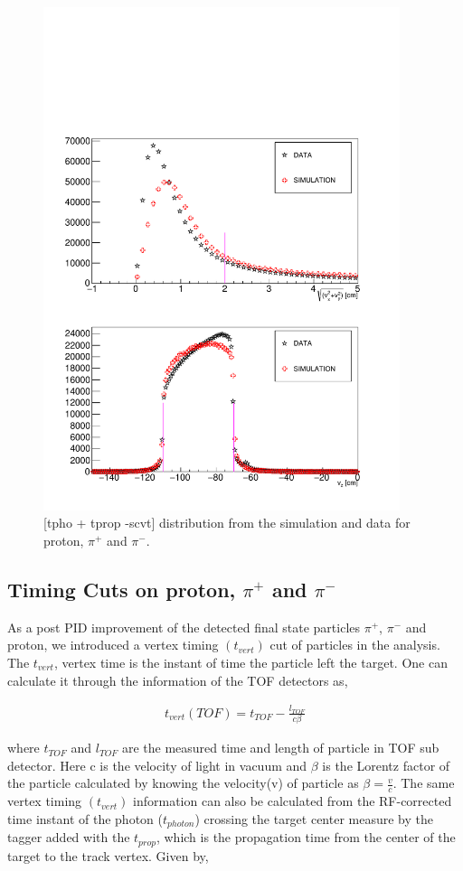 \begin{figure}[ht!]
\centerline{
\includegraphics[height=5.8in]{vertex.pdf}}
\caption{[tpho + tprop -scvt] distribution from the simulation and data for proton, $\pi^{+}$ and $\pi^{-}$.}
\label{Fig1}
\end{figure}

\subsection{Timing Cuts on proton, $\pi^{+}$ and $\pi^{-}$}
\label{TCut}
As a post PID improvement of the detected final state particles $\pi^{+}$, $\pi^{-}$ and proton, we introduced a vertex timing $(t_{vert})$ cut of particles in the analysis. The $t_{vert}$, vertex time is the instant of time the particle left the target. One can calculate it through the information of the TOF detectors as,

\begin{eqnarray*}
t_{vert}(TOF) = t_{TOF}  -  \frac{l_{TOF}}{c\beta}
\end{eqnarray*}

where $t_{TOF}$ and $l_{TOF}$ are the measured time and length of particle in TOF sub detector. Here c is the velocity of light in vacuum and $\beta$ is the Lorentz factor of the particle calculated by knowing the velocity(v) of particle as $\beta = \frac{v}{c}$. The same vertex timing $(t_{vert})$ information can also be calculated from the RF-corrected time instant of the photon ($t_{photon}$)  crossing the target center measure by the tagger added with the $t_{prop}$, which is the propagation time from the center of the target to the track vertex. Given by,

